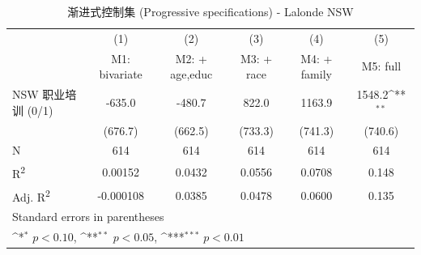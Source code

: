 \begin{table}[htbp]\centering
\def\sym#1{\ifmmode^{#1}\else\(^{#1}\)\fi}
\caption{渐进式控制集 (Progressive specifications) - Lalonde NSW}
\begin{tabular}{l*{5}{c}}
\toprule
                    &\multicolumn{1}{c}{(1)}&\multicolumn{1}{c}{(2)}&\multicolumn{1}{c}{(3)}&\multicolumn{1}{c}{(4)}&\multicolumn{1}{c}{(5)}\\
                    &\multicolumn{1}{c}{M1: bivariate}&\multicolumn{1}{c}{M2: + age,educ}&\multicolumn{1}{c}{M3: + race}&\multicolumn{1}{c}{M4: + family}&\multicolumn{1}{c}{M5: full}\\
\midrule
NSW 职业培训 (0/1)  &      -635.0         &      -480.7         &       822.0         &      1163.9         &      1548.2\sym{**} \\
                    &     (676.7)         &     (662.5)         &     (733.3)         &     (741.3)         &     (740.6)         \\
\midrule
N                   &         614         &         614         &         614         &         614         &         614         \\
R\textsuperscript{2}&     0.00152         &      0.0432         &      0.0556         &      0.0708         &       0.148         \\
Adj. R\textsuperscript{2}&   -0.000108         &      0.0385         &      0.0478         &      0.0600         &       0.135         \\
\bottomrule
\multicolumn{6}{l}{\footnotesize Standard errors in parentheses}\\
\multicolumn{6}{l}{\footnotesize \sym{*} \(p<0.10\), \sym{**} \(p<0.05\), \sym{***} \(p<0.01\)}\\
\end{tabular}
\end{table}
